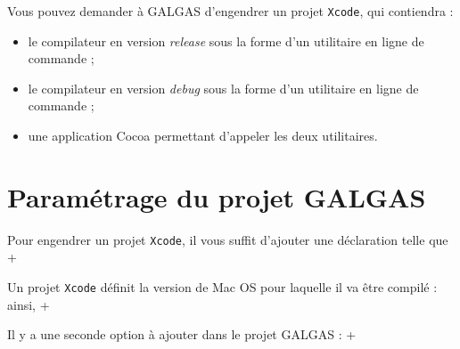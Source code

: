 

Vous pouvez demander à GALGAS d'engendrer un projet \texttt{Xcode}, qui contiendra :
\begin{itemize}
  \item le compilateur en version \emph{release} sous la forme d'un utilitaire en ligne de commande ; 
  \item le compilateur en version \emph{debug} sous la forme d'un utilitaire en ligne de commande ; 
  \item une application Cocoa permettant d'appeler les deux utilitaires.
\end{itemize}






\section{Paramétrage du projet GALGAS}

Pour engendrer un projet \texttt{Xcode}, il vous suffit d'ajouter une déclaration telle que \ggs+%

\begin{galgas}
project (0:0:1) -> "logo" {
  ...
\end{galgas}

Un projet \texttt{Xcode} définit la version de Mac OS pour laquelle il va être compilé : ainsi, \ggs+%

Il y a une seconde option à ajouter dans le projet GALGAS : \ggs+%


